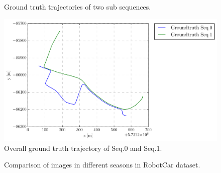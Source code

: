 \begin{figure}
	\centering
	\caption{Ground truth trajectories of two sub sequences.}
	\label{fig:robotcargt}
\end{figure}

\begin{figure}[H]
	\centering
	\includegraphics[width=5in]{Chapter3/overall_gt_top_.pdf}
	\caption{Overall ground truth trajectory of Seq.0 and Seq.1.}
	\label{fig:robotcaroverallgt} 
\end{figure}

\begin{figure}
	\centering
	\caption{Comparison of images in different seasons in RobotCar dataset.}
	\label{fig:robotcarcomparisonseason}
\end{figure}


